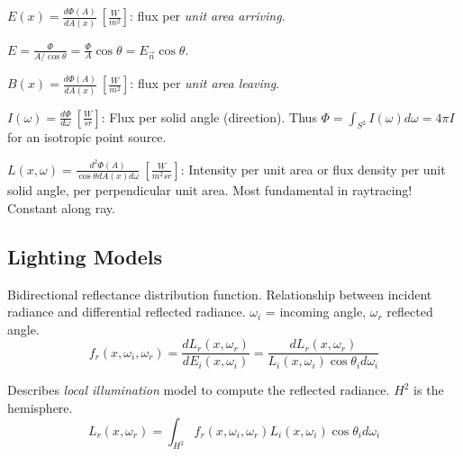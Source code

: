 \begin{definition}[Irradiance]
  \(E(x) = \frac{d \Phi(A)}{d A(x)} \ \left[\frac{W}{m^2}\right]\):
  flux per \textit{unit area arriving}.
\end{definition}

\begin{algorithm}
  \(E =\frac{\Phi}{A / \cos \theta} = \frac{\Phi}{A} \cos \theta = E_{\vec{n}} \cos \theta\).
\end{algorithm}

\begin{definition}[Radiosity]
  \(B(x) = \frac{d\Phi(A)}{dA(x)} \ \left[\frac{W}{m^2}\right]\):
  flux per \textit{unit area leaving}.
\end{definition}

\begin{definition}[Intensity]
  \(I(\omega) = \frac{d\Phi}{d\omega} \ \left[\frac{W}{sr}\right]\):
  Flux per solid angle (direction). Thus \(\Phi = \int_{S^2} I(\omega) d\omega = 4 \pi I\) for an isotropic point source.
\end{definition}

\begin{definition}[Radiance]
  \(L(x, \omega) = \frac{d^2 \Phi(A)}{\cos \theta dA(x) d\omega} \ \left[\frac{W}{m^2sr}\right]\):
  Intensity per unit area or flux density per unit solid angle, per perpendicular unit area. Most fundamental in raytracing! Constant along ray.
\end{definition}

\subsection{Lighting Models}
\begin{definition}[BRDF]
  Bidirectional reflectance distribution function. Relationship between incident radiance and differential reflected radiance. \(\omega_i\) = incoming angle, \(\omega_r\) reflected angle.
  \[f_r(x, \omega_i, \omega_r) = \frac{dL_r(x, \omega_r)}{dE_i(x, \omega_i)} = \frac{dL_r(x, \omega_r)}{L_i(x, \omega_i) \cos \theta_i d\omega_i}\]
\end{definition}

\begin{definition}
  Describes \textit{local illumination} model to compute the reflected radiance. \(H^2\) is the hemisphere.
  \[L_r(x, \omega_r) = \int_{H^2}f_r(x, \omega_i, \omega_r)L_i(x, \omega_i) \cos \theta_i d \omega_i\]
\end{definition}

